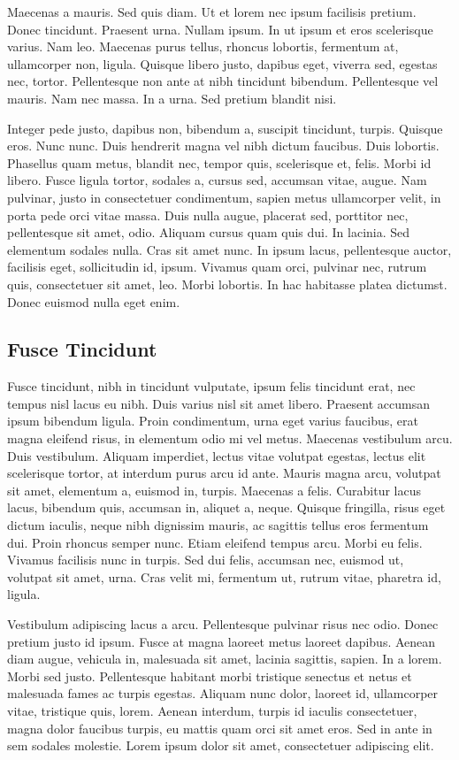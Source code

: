 \documentclass[12pt]{article}
\begin{document}
Maecenas a mauris. Sed quis diam. Ut et lorem nec ipsum facilisis pretium. Donec tincidunt. Praesent urna. Nullam ipsum. In ut ipsum et eros scelerisque varius. Nam leo. Maecenas purus tellus, rhoncus lobortis, fermentum at, ullamcorper non, ligula. Quisque libero justo, dapibus eget, viverra sed, egestas nec, tortor. Pellentesque non ante at nibh tincidunt bibendum. Pellentesque vel mauris. Nam nec massa. In a urna. Sed pretium blandit nisi. \cite{test2}

Integer pede justo, dapibus non, bibendum a, suscipit tincidunt, turpis. Quisque eros. Nunc nunc. Duis hendrerit magna vel nibh dictum faucibus. Duis lobortis. Phasellus quam metus, blandit nec, tempor quis, scelerisque et, felis. Morbi id libero. Fusce ligula tortor, sodales a, cursus sed, accumsan vitae, augue. Nam pulvinar, justo in consectetuer condimentum, sapien metus ullamcorper velit, in porta pede orci vitae massa. Duis nulla augue, placerat sed, porttitor nec, pellentesque sit amet, odio. Aliquam cursus quam quis dui. In lacinia. Sed elementum sodales nulla. Cras sit amet nunc. In ipsum lacus, pellentesque auctor, facilisis eget, sollicitudin id, ipsum. Vivamus quam orci, pulvinar nec, rutrum quis, consectetuer sit amet, leo. Morbi lobortis. In hac habitasse platea dictumst. Donec euismod nulla eget enim.

\subsection{Fusce Tincidunt}
Fusce tincidunt, nibh in tincidunt vulputate, ipsum felis tincidunt erat, nec tempus nisl lacus eu nibh. Duis varius nisl sit amet libero. Praesent accumsan ipsum bibendum ligula. Proin condimentum, urna eget varius faucibus, erat magna eleifend risus, in elementum odio mi vel metus. Maecenas vestibulum arcu. Duis vestibulum. Aliquam imperdiet, lectus vitae volutpat egestas, lectus elit scelerisque tortor, at interdum purus arcu id ante. Mauris magna arcu, volutpat sit amet, elementum a, euismod in, turpis. Maecenas a felis. Curabitur lacus lacus, bibendum quis, accumsan in, aliquet a, neque. Quisque fringilla, risus eget dictum iaculis, neque nibh dignissim mauris, ac sagittis tellus eros fermentum dui. Proin rhoncus semper nunc. Etiam eleifend tempus arcu. Morbi eu felis. Vivamus facilisis nunc in turpis. Sed dui felis, accumsan nec, euismod ut, volutpat sit amet, urna. Cras velit mi, fermentum ut, rutrum vitae, pharetra id, ligula.

Vestibulum adipiscing lacus a arcu. Pellentesque pulvinar risus nec odio. Donec pretium justo id ipsum. Fusce at magna laoreet metus laoreet dapibus. Aenean diam augue, vehicula in, malesuada sit amet, lacinia sagittis, sapien. In a lorem. Morbi sed justo. Pellentesque habitant morbi tristique senectus et netus et malesuada fames ac turpis egestas. Aliquam nunc dolor, laoreet id, ullamcorper vitae, tristique quis, lorem. Aenean interdum, turpis id iaculis consectetuer, magna dolor faucibus turpis, eu mattis quam orci sit amet eros. Sed in ante in sem sodales molestie. Lorem ipsum dolor sit amet, consectetuer adipiscing elit.
\end{document}
